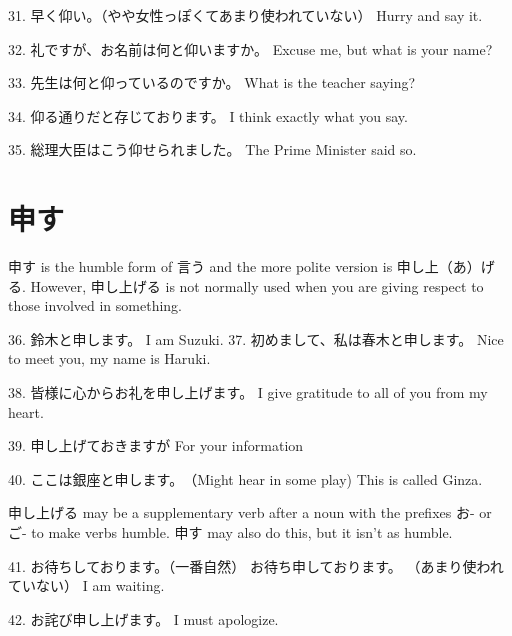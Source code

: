 \par{31. 早く仰い。（やや女性っぽくてあまり使われていない） \hfill\break
Hurry and say it. }

\par{32. 礼ですが、お名前は何と仰いますか。 \hfill\break
Excuse me, but what is your name? }

\par{33. 先生は何と仰っているのですか。 \hfill\break
What is the teacher saying? }

\par{34. 仰る通りだと存じております。 \hfill\break
I think exactly what you say. }

\par{35. 総理大臣はこう仰せられました。 \hfill\break
The Prime Minister said so. }
      
\section{申す}
 
\par{ 申す is the humble form of 言う and the more polite version is 申し上（あ）げる. However, 申し上げる is not normally used when you are giving respect to those involved in something. }

\par{36. 鈴木と申します。 \hfill\break
I am Suzuki. }
37. 初めまして、私は春木と申します。 \hfill\break
Nice to meet you, my name is Haruki. 
\par{38. 皆様に心からお礼を申し上げます。 \hfill\break
I give gratitude to all of you from my heart. }

\par{39. 申し上げておきますが \hfill\break
For your information }

\par{40. ここは銀座と申します。　（Might hear in some play) \hfill\break
This is called Ginza. }

\par{ 申し上げる may be a supplementary verb after a noun with the prefixes お- or ご- to make verbs humble. 申す may also do this, but it isn't as humble. }

\par{41. お待ちしております。（一番自然） \hfill\break
お待ち申しております。 （あまり使われていない） \hfill\break
I am waiting. }

\par{42. お詫び申し上げます。 \hfill\break
I must apologize. }

